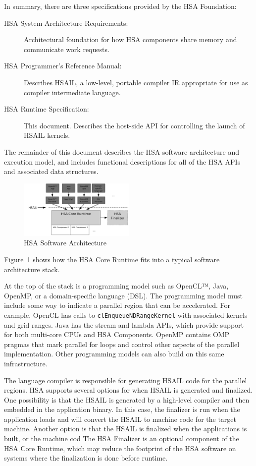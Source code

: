 In summary, there are three specifications provided by the HSA
Foundation:
\begin{description}
\item[HSA System Architecture Requirements:] Architectural foundation for
how HSA components share memory and communicate work requests.
\item[HSA Programmer’s Reference Manual:] Describes HSAIL, a low-level,
portable compiler IR appropriate for use as compiler intermediate
language.
\item[HSA Runtime Specification:] This document.  Describes the host-side
API for controlling the launch of HSAIL kernels.
\end{description}

The remainder of this document describes the HSA software
architecture and execution model, and includes functional
descriptions for all of the HSA APIs and associated data structures. 

\begin{figure}
  \centering
  \includegraphics[width=0.5\textwidth]{swarch}
  \centering
  \caption{HSA Software Architecture}
  \label{fig:swarch}
\end{figure}

Figure~\ref{fig:swarch} shows how the HSA Core Runtime fits into a
typical software architecture stack.

At the top of the stack is a programming model such as OpenCL™,
Java, OpenMP, or a domain-specific language (DSL).   The programming
model must include some way to indicate a parallel region that can
be accelerated.  For example, OpenCL has calls to
\texttt{clEnqueueNDRangeKernel} with associated kernels and grid ranges.
Java has the stream and lambda APIs, which provide support for both
multi-core CPUs and HSA Components.  OpenMP contains OMP pragmas
that mark parallel for loops and control other aspects of the
parallel implementation.  Other programming models can also build on
this same infrastructure.

The language compiler is responsible for generating HSAIL code for
the parallel regions.  HSA supports several options for when HSAIL
is generated and finalized.  One possibility is that the HSAIL is
generated by a high-level compiler and then embedded in the
application binary.  In this case, the finalizer is run when the
application loads and will convert the HSAIL to machine code for the
target machine.   Another option is that the HSAIL is finalized when
the applications is built, or the machine cod  The HSA Finalizer is
an optional component of the HSA Core Runtime, which may reduce the
footprint of the HSA software on systems where the finalization is
done before runtime. 

